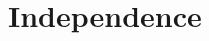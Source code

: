 \documentclass[8pt, usepdftitle = false]{beamer}
\newcounter{mytheorem}
\renewcommand{\themytheorem}{2.\arabic{mytheorem}}
\newcommand{\Thm}[1]{\refstepcounter{mytheorem}\textbf{#1\color{blue}\themytheorem}:}
\begin{document}











\section{Independence}
\frame{\sectionpage}
\end{document}
